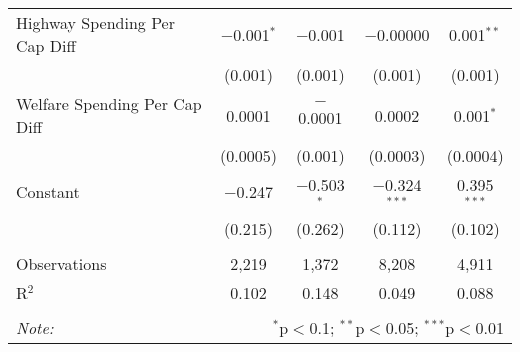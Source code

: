 \begin{table}[!htbp]
\begin{tabular}{@{\extracolsep{5pt}}lcccc}
  Highway Spending Per Cap Diff & $-$0.001$^{*}$ & $-$0.001 & $-$0.00000 & 0.001$^{**}$ \\ 
  & (0.001) & (0.001) & (0.001) & (0.001) \\ 
  Welfare Spending Per Cap Diff & 0.0001 & $-$0.0001 & 0.0002 & 0.001$^{*}$ \\ 
  & (0.0005) & (0.001) & (0.0003) & (0.0004) \\ 
  Constant & $-$0.247 & $-$0.503$^{*}$ & $-$0.324$^{***}$ & 0.395$^{***}$ \\ 
  & (0.215) & (0.262) & (0.112) & (0.102) \\ 
 \hline \\[-1.8ex] 
Observations & 2,219 & 1,372 & 8,208 & 4,911 \\ 
R$^{2}$ & 0.102 & 0.148 & 0.049 & 0.088 \\ 
\hline 
\hline \\[-1.8ex] 
\textit{Note:}  & \multicolumn{4}{r}{$^{*}$p$<$0.1; $^{**}$p$<$0.05; $^{***}$p$<$0.01} \\ 
\end{tabular} 
\end{table} 
